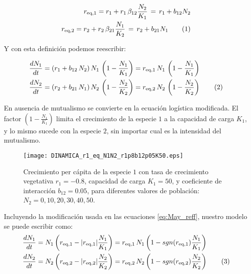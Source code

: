 \begin{align*}
\displaystyle r_{\rm{eq},1}=r_1 + r_1\, \beta_{12} \frac{N_2}{K_1}\, =\, r_1 + b_{12}N_2  \\
\displaystyle r_{\rm{eq},2}=r_2 + r_2\, \beta_{21} \frac{N_1}{K_2}\, =\, r_2 + b_{21}N_1 \stepcounter{equation}
\tag{\theequation}
\end{align*}

Y con esta definición podemos reescribir:

\begin{align*}
\displaystyle & \frac{dN_1}{dt}= (r_1 + b_{12}\, N_2) \, N_1\,\left(1-\frac{N_1}{K_1}\right)=r_{\rm{eq},1}\,N_1\,\left(1-\frac{N_1}{K_1}\right) \\
\displaystyle & \frac{dN_2}{dt}= (r_2 + b_{21}\, N_1) \, N_2\,\left(1-\frac{N_2}{K_2}\right)=r_{\rm{eq},2}\,N_2\,\left(1-\frac{N_2}{K_2}\right)
\stepcounter{equation}\tag{\theequation}
\label{eq:May_reff}
\end{align*}

En ausencia de mutualismo se convierte en la ecuación logística modificada. El factor $\left(1-\frac{N_{1}}{K_{1}}\right)$ limita el crecimiento de la especie $1$ a la capacidad de carga $K_{1}$, y lo mismo sucede con la especie $2$, sin importar cual es la intensidad del mutualismo.

\begin{figure}[t]
\centering
\texttt{[image: DINAMICA\_r1\_eq\_N1N2\_r1p8b12p05K50.eps]}
\caption{Crecimiento per cápita de la especie $1$ con tasa de crecimiento vegetativa $r_1=-0.8$, capacidad de carga $K_1=50$, y coeficiente de interacción $b_{12}=0.05$, para diferentes valores de población: $N_2=0,10,20,30,40,50$.}
\label{fig:per capita_growth_rate_mutualism}
\end{figure}

Incluyendo la modificación usada en las ecuaciones \ref{eq:May_reff}, nuestro modelo se puede escribir como:
\begin{align*}
\displaystyle & \frac{dN_1}{dt}= N_{1} \left( r_{\rm{eq},1}- |r_{\rm{eq},1}| \frac{N_1}{K_1} \right) = r_{\rm{eq},1}\, N_1 \left(1-sgn(r_{\rm{eq},1})\frac{N_1}{K_1}\right)\\
\displaystyle & \frac{dN_2}{dt}= N_{2} \left( r_{\rm{eq},2}- |r_{\rm{eq},2}| \frac{N_2}{K_2} \right)= r_{\rm{eq},2}\, N_2 \left(1-sgn(r_{\rm{eq},2})\frac{N_2}{K_2}\right)
\stepcounter{equation}\tag{\theequation}\label{eq:new_model}
\end{align*}

